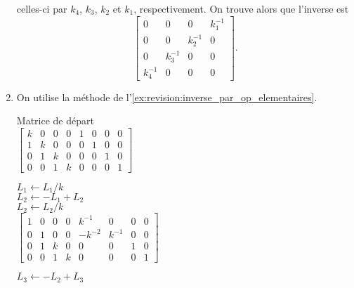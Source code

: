 \begin{exercice}
\begin{sol}
\begin{enumerate}
      celles-ci par $k_4$, $k_3$, $k_2$ et $k_1$, respectivement. On
      trouve alors que l'inverse est
      \begin{displaymath}
        \begin{bmatrix}
          0 & 0 & 0 & k_1^{-1} \\
          0 & 0 & k_2^{-1} & 0 \\
          0 & k_3^{-1} & 0 & 0 \\
          k_4^{-1} & 0 & 0 & 0
        \end{bmatrix}.
      \end{displaymath}
      \pagebreak[3]
    \item On utilise la méthode de l'\autoref{ex:revision:inverse_par_op_elementaires}.
      \setlength{\ocolumnsep}{\columnsep}
      \setlength{\columnsep}{-120pt}
      \begin{multicols}{2}
        Matrice de départ \\
        \columnbreak
        $%
        \left[
          \begin{array}{rrrr|rrrr}
            k & 0 & 0 & 0 & 1 & 0 & 0 & 0 \\
            1 & k & 0 & 0 & 0 & 1 & 0 & 0 \\
            0 & 1 & k & 0 & 0 & 0 & 1 & 0 \\
            0 & 0 & 1 & k & 0 & 0 & 0 & 1
          \end{array}
        \right]
        $
      \end{multicols}
      \begin{multicols}{2}
        $L_1 \leftarrow L_1/k$ \\
        $L_2 \leftarrow - L_1 + L_2$ \\
        $L_2 \leftarrow L_2/k$ \\
        \columnbreak
        $%
        \left[
          \begin{array}{rrrr|rrrr}
            1 & 0 & 0 & 0 &  k^{-1} &     0 & 0 & 0 \\
            0 & 1 & 0 & 0 & -k^{-2} & k^{-1} & 0 & 0 \\
            0 & 1 & k & 0 &       0 &     0 & 1 & 0 \\
            0 & 0 & 1 & k &       0 &     0 & 0 & 1
          \end{array}
        \right]
        $
      \end{multicols}
      \begin{multicols}{2}
        $L_3 \leftarrow - L_2 + L_3$ \\

\end{multicols}
\end{enumerate}
\end{sol}
\end{exercice}
